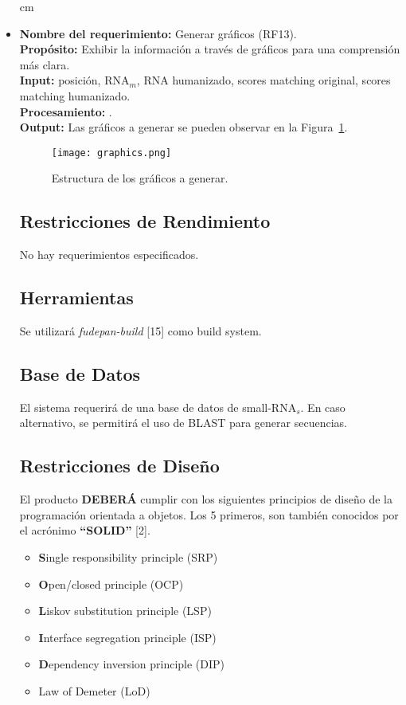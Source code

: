 \documentclass[12pt,a4paper,spanish]{article}
\begin{document}
\begin{itemize}
		 cm
		\item \textbf{Nombre del requerimiento:} Generar gráficos (RF13).\\
 	    \textbf{Propósito:} Exhibir la información a través de gráficos para una comprensión más clara.\\
		\textbf{Input:} posición, RNA$_m$, RNA humanizado, scores matching original, scores matching humanizado. \\
		\textbf{Procesamiento:} .\\
		\textbf{Output:} Las gráficos a generar se pueden observar en la Figura~\ref{graphic}.
			\begin{figure}[h]
				\begin{center}
					\texttt{[image: graphics.png]}
					\caption{Estructura de los gráficos a generar.}
					\label{graphic}
				\end{center}
			\end{figure}

\subsection{Restricciones de Rendimiento}
No hay requerimientos especificados.

\subsection{Herramientas}
	Se utilizará \textit{fudepan-build} [15] como build system.

\subsection{Base de Datos}
	\par El sistema requerirá de una base de datos de small-RNA$_s$. En caso alternativo, se permitirá el uso de BLAST para generar secuencias. 

\subsection{Restricciones de Diseño}
\par El producto \textbf{DEBERÁ} cumplir con los siguientes principios de diseño de la
programación orientada a objetos. Los 5 primeros, son también conocidos por
el acrónimo \textbf{``SOLID''} [2].
\begin{itemize}
	\item \textbf{S}ingle responsibility principle (SRP)
	\item \textbf{O}pen/closed principle (OCP)
	\item \textbf{L}iskov substitution principle (LSP)
	\item \textbf{I}nterface segregation principle (ISP)
	\item \textbf{D}ependency inversion principle (DIP)	
	\item Law of Demeter (LoD)
\end{itemize}


\end{itemize}
\end{document}
